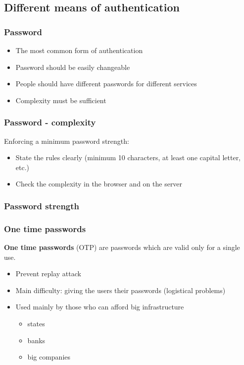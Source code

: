 \subsection{Different means of authentication}

\begin{frame}
\frametitle{Password}

\begin{itemize}
\item The most common form of authentication
\item Password should be easily changeable
\item People should have different passwords for different services
\item Complexity must be sufficient
\end{itemize}
\end{frame}

\begin{frame}
\frametitle{Password - complexity}
Enforcing a minimum password strength:
\begin{itemize}
\item State the rules clearly (minimum 10 characters, at least one capital
letter, etc.)
\item Check the complexity in the browser and on the server
\end{itemize}
\end{frame}

\begin{frame}
\frametitle{Password strength}
\end{frame}

\begin{frame}
\frametitle{One time passwords}
\textbf{One time passwords} (OTP) are passwords which are valid only for a
single use.
\begin{itemize}
\item Prevent replay attack
\item Main difficulty: giving the users their passwords
	{\small (logistical problems)}
\item Used mainly by those who can afford big infrastructure
	\begin{itemize}
	\item states
	\item banks
	\item big companies
	\end{itemize}
\end{itemize}
\end{frame}

